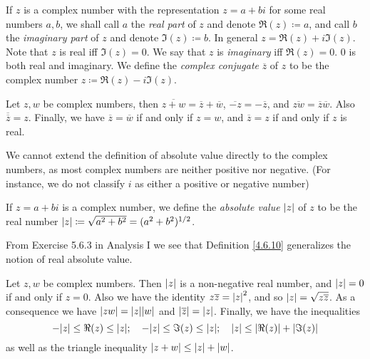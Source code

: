 \begin{definition}\label{4.6.8}
    If \(z\) is a complex number with the representation \(z = a + bi\) for some real numbers \(a, b\), we shall call \(a\) the \emph{real part} of \(z\) and denote \(\Re(z) \coloneqq a\), and call \(b\) the \emph{imaginary part} of \(z\) and denote \(\Im(z) \coloneqq b\).
    In general \(z = \Re(z) + i \Im(z)\).
    Note that \(z\) is real iff \(\Im(z) = 0\).
    We say that \(z\) is \emph{imaginary} iff \(\Re(z) = 0\).
    \(0\) is both real and imaginary.
    We define the \emph{complex conjugate} \(\overline{z}\) of \(z\) to be the complex number \(z \coloneqq \Re(z) - i \Im(z)\).
\end{definition}

\begin{lemma}\label{4.6.9}
    Let \(z, w\) be complex numbers, then \(\overline{z + w} = \overline{z} + \overline{w}\), \(\overline{-z} = -\overline{z}\), and \(\overline{zw} = \overline{z} \overline{w}\).
    Also \(\overline{\overline{z}} = z\).
    Finally, we have \(\overline{z} = \overline{w}\) if and only if \(z = w\), and \(\overline{z} = z\) if and only if \(z\) is real.
\end{lemma}

\begin{note}
    We cannot extend the definition of absolute value directly to the complex numbers, as most complex numbers are neither positive nor negative.
    (For instance, we do not classify \(i\) as either a positive or negative number)
\end{note}

\begin{definition}\label{4.6.10}
    If \(z = a + bi\) is a complex number, we define the \emph{absolute value} \(\abs*{z}\) of \(z\) to be the real number \(\abs*{z} \coloneqq \sqrt{a^2 + b^2} = (a^2 + b^2)^{1 / 2}\).
\end{definition}

\begin{note}
    From Exercise 5.6.3 in Analysis I we see that Definition \ref{4.6.10} generalizes the notion of real absolute value.
\end{note}

\begin{lemma}\label{4.6.11}
    Let \(z, w\) be complex numbers.
    Then \(\abs*{z}\) is a non-negative real number, and \(\abs*{z} = 0\) if and only if \(z = 0\).
    Also we have the identity \(z \overline{z} = \abs*{z}^2\), and so \(\abs*{z} = \sqrt{z \overline{z}}\).
    As a consequence we have \(\abs*{zw} = \abs*{z} \abs*{w}\) and \(\abs*{\overline{z}} = \abs*{z}\).
    Finally, we have the inequalities
    \[
        -\abs*{z} \leq \Re(z) \leq \abs*{z}; \quad -\abs*{z} \leq \Im(z) \leq \abs*{z}; \quad \abs*{z} \leq \abs*{\Re(z)} + \abs*{\Im(z)}
    \]
    as well as the triangle inequality \(\abs*{z + w} \leq \abs*{z} + \abs*{w}\).
\end{lemma}

